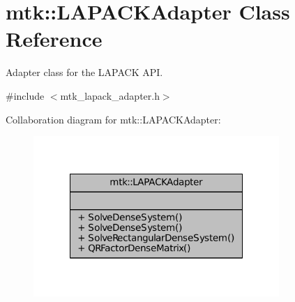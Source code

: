 \hypertarget{classmtk_1_1LAPACKAdapter}{\section{mtk\-:\-:L\-A\-P\-A\-C\-K\-Adapter Class Reference}
\label{classmtk_1_1LAPACKAdapter}
}


Adapter class for the L\-A\-P\-A\-C\-K A\-P\-I.  




{\ttfamily \#include $<$mtk\-\_\-lapack\-\_\-adapter.\-h$>$}



Collaboration diagram for mtk\-:\-:L\-A\-P\-A\-C\-K\-Adapter\-:
\nopagebreak
\begin{figure}[H]
\begin{center}
\leavevmode
\includegraphics[width=264pt]{classmtk_1_1LAPACKAdapter__coll__graph}
\end{center}
\end{figure}

